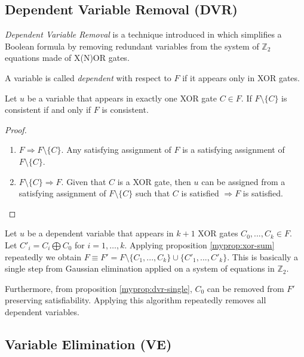 \subsection{Dependent Variable Removal (DVR)}
\label{ssec:dvr}

\emph{Dependent Variable Removal} is a technique introduced in
\cite{mine:march} which simplifies a Boolean formula by removing
redundant variables from the system of $\mathbb{Z}_2$ equations
made of X(N)OR gates.

\begin{mydef}
  A variable is called \emph{dependent} with respect to $F$ if it
  appears only in XOR gates.
\end{mydef}

\begin{myprop}[DVR]
  \label{myprop:dvr-single}
  Let $u$ be a variable that appears in exactly one XOR gate $C
  \in F$. If $F \setminus \{C\}$ is consistent if and only if $F$
  is consistent.
\end{myprop}

\begin{proof}
  \begin{enumerate}
    \item $F \Rightarrow F \setminus \{C\}$. Any satisfying
    assignment of $F$ is a satisfying assignment of $F \setminus
    \{C\}$. 
    \item $F \setminus \{C\} \Rightarrow F$.  Given that $C$ is a XOR
    gate, then $u$ can be assigned from a satisfying assignment of
    $F \setminus \{C\}$ such that $C$ is satisfied $\Rightarrow F$
    is satisfied.
  \end{enumerate}
\end{proof}


Let $u$ be a dependent variable that appears in $k + 1$ XOR gates
$C_0, ..., C_k \in F$. Let $C'_i = C_i \bigoplus C_0$ for $i = 1,
\ldots, k$.  Applying proposition \ref{myprop:xor-sum} repeatedly we
obtain $F \equiv F' = F \setminus \{C_{1}, ..., C_k\} \cup \{C'_{1},
..., C'_k\}$. This is basically a single step from Gaussian
elimination applied on a system of equations in $\mathbb{Z}_2$.

Furthermore, from proposition \ref{myprop:dvr-single}, $C_0$ can be
removed from $F'$ preserving satisfiability. Applying this algorithm
repeatedly removes all dependent variables.


\subsection{Variable Elimination (VE)}
\label{ssec:ve}

